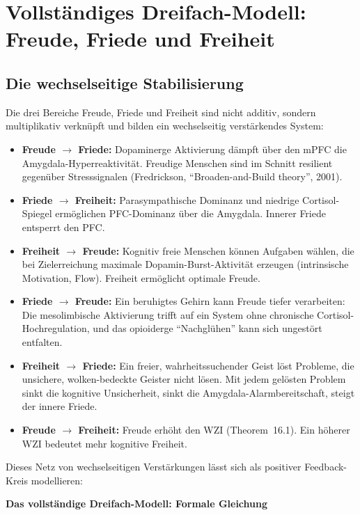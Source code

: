 ﻿\documentclass[12pt,a4paper]{report}
\theoremstyle{plain}
\theoremstyle{definition}
\theoremstyle{remark}
\begin{document}
	\section{Vollständiges Dreifach-Modell: Freude, Friede und Freiheit}

	\subsection{Die wechselseitige Stabilisierung}

	Die drei Bereiche Freude, Friede und Freiheit sind nicht additiv,
	sondern multiplikativ verknüpft und bilden ein wechselseitig
	verstärkendes System:

	\begin{itemize}
		\item \textbf{Freude $\to$ Friede:} Dopaminerge Aktivierung
		dämpft über den mPFC die Amygdala-Hyperreaktivität.
		Freudige Menschen sind im Schnitt resilient gegenüber Stresssignalen
		(Fredrickson, ``Broaden-and-Build theory'', 2001).
		\item \textbf{Friede $\to$ Freiheit:} Parasympathische Dominanz
		und niedrige Cortisol-Spiegel ermöglichen PFC-Dominanz über
		die Amygdala. Innerer Friede entsperrt den PFC.
		\item \textbf{Freiheit $\to$ Freude:} Kognitiv freie Menschen
		können Aufgaben wählen, die bei Zielerreichung maximale
		Dopamin-Burst-Aktivität erzeugen (intrinsische Motivation,
		Flow). Freiheit ermöglicht optimale Freude.
		\item \textbf{Friede $\to$ Freude:} Ein beruhigtes Gehirn
		kann Freude tiefer verarbeiten: Die mesolimbische Aktivierung
		trifft auf ein System ohne chronische Cortisol-Hochregulation,
		und das opioiderge ``Nachglühen'' kann sich ungestört entfalten.
		\item \textbf{Freiheit $\to$ Friede:} Ein freier, wahrheitssuchender
		Geist löst Probleme, die unsichere, wolken-bedeckte Geister
		nicht lösen. Mit jedem gelösten Problem sinkt die kognitive
		Unsicherheit, sinkt die Amygdala-Alarmbereitschaft,
		steigt der innere Friede.
		\item \textbf{Freude $\to$ Freiheit:} Freude erhöht den WZI
		(Theorem~16.1). Ein höherer WZI bedeutet mehr kognitive Freiheit.
	\end{itemize}

	Dieses Netz von wechselseitigen Verstärkungen lässt sich als
	positiver Feedback-Kreis modellieren:

	
	\noindent\textbf{Das vollständige Dreifach-Modell: Formale Gleichung}
\end{document}
